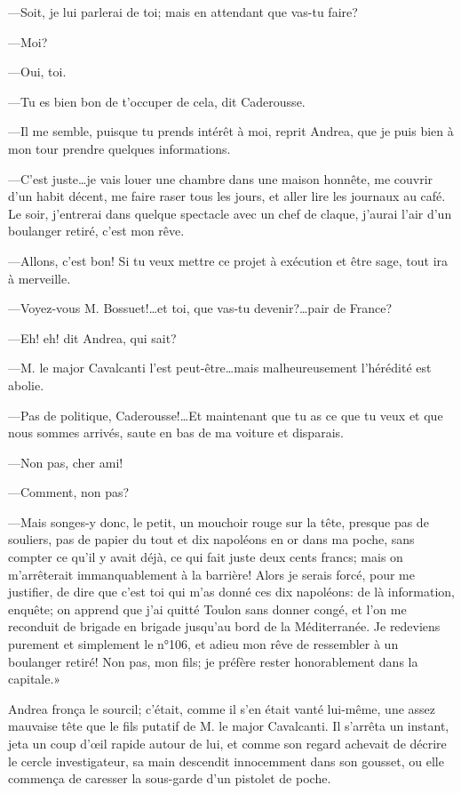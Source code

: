 —Soit, je lui parlerai de toi; mais en attendant que vas-tu faire? 

—Moi? 

—Oui, toi. 

—Tu es bien bon de t'occuper de cela, dit Caderousse. 

—Il me semble, puisque tu prends intérêt à moi, reprit Andrea, que je puis bien à mon tour prendre quelques informations. 

—C'est juste\dots je vais louer une chambre dans une maison honnête, me couvrir d'un habit décent, me faire raser tous les jours, et aller lire les journaux au café. Le soir, j'entrerai dans quelque spectacle avec un chef de claque, j'aurai l'air d'un boulanger retiré, c'est mon rêve. 

—Allons, c'est bon! Si tu veux mettre ce projet à exécution et être sage, tout ira à merveille. 

—Voyez-vous M. Bossuet!\dots et toi, que vas-tu devenir?\dots pair de France?  

—Eh! eh! dit Andrea, qui sait? 

—M. le major Cavalcanti l'est peut-être\dots mais malheureusement l'hérédité est abolie. 

—Pas de politique, Caderousse!\dots Et maintenant que tu as ce que tu veux et que nous sommes arrivés, saute en bas de ma voiture et disparais. 

—Non pas, cher ami! 

—Comment, non pas? 

—Mais songes-y donc, le petit, un mouchoir rouge sur la tête, presque pas de souliers, pas de papier du tout et dix napoléons en or dans ma poche, sans compter ce qu'il y avait déjà, ce qui fait juste deux cents francs; mais on m'arrêterait immanquablement à la barrière! Alors je serais forcé, pour me justifier, de dire que c'est toi qui m'as donné ces dix napoléons: de là information, enquête; on apprend que j'ai quitté Toulon sans donner congé, et l'on me reconduit de brigade en brigade jusqu'au bord de la Méditerranée. Je redeviens purement et simplement le n°106, et adieu mon rêve de ressembler à un boulanger retiré! Non pas, mon fils; je préfère rester honorablement dans la capitale.» 

Andrea fronça le sourcil; c'était, comme il s'en était vanté lui-même, une assez mauvaise tête que le fils putatif de M. le major Cavalcanti. Il s'arrêta un instant, jeta un coup d'œil rapide autour de lui, et comme son regard achevait de décrire le cercle investigateur, sa main descendit innocemment dans son gousset, ou elle commença de caresser la sous-garde d'un pistolet de poche. 

